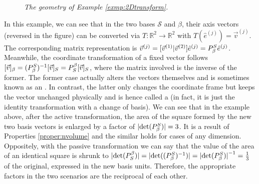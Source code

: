 \begin{solution}
\begin{figure}[ht!]
\caption{\textit{The geometry of Example \ref{exmp:2Dtransform}.}}
\label{fig:coordtransgeo}
\end{figure}
\end{solution}
In this example, we can see that in the two bases $\mathcal{S}$ and $\mathcal{\beta}$, their axis vectors (reversed in the figure) can be converted via $T: \mathbb{R}^2 \to \mathbb{R}^2$ with $T(\hat{e}^{(j)}) = \vec{v}^{(j)}$. The corresponding matrix representation is $\vec{v}^{(j)} = [\vec{v}^{(1)}|\vec{v}^{(2)}]\hat{e}^{(j)} = \smash{P_\beta^S}\hat{e}^{(j)}$. Meanwhile, the coordinate transformation of a fixed vector follows $[\vec{v}]_\beta = \smash{(P_\beta^S)^{-1}}[\vec{v}]_S = \smash{P_S^\beta}[\vec{v}]_S$, where the matrix involved is the inverse of the former. The former case actually alters the vectors themselves and is sometimes known as an . In contrast, the latter only changes the coordinate frame but keeps the vector unchanged physically and is hence called a  (in fact, it is just the identity transformation with a change of basis). We can see that in the example above, after the active transformation, the area of the square formed by the new two basis vectors is enlarged by a factor of $\abs{\det(\smash{P_\beta^S})}=3$. It is a result of Properties \ref{proper:nvolume} and the similar holds for cases of any dimension. Oppositely, with the passive transformation we can say that the value of the area of an identical square is shrunk to $\abs{\det(\smash{P_S^\beta})} = \abs{\det(\smash{(P_\beta^S)^{-1}})} = \abs{\det(\smash{P_\beta^S})}^{-1} = \frac{1}{3}$ of the original, expressed in the new basis units. Therefore, the appropriate factors in the two scenarios are the reciprocal of each other.

